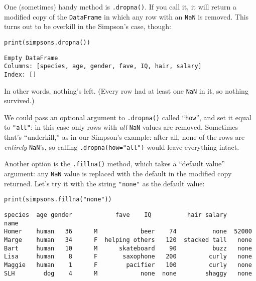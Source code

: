 
One (sometimes) handy method is \texttt{.dropna()}. If you call it, it will
return a modified copy of the \texttt{DataFrame} in which any row with an
\texttt{NaN} is removed. This turns out to be overkill in the Simpson's case,
though:

\begin{Verbatim}[fontsize=\small,samepage=true,frame=single,framesep=3mm]
print(simpsons.dropna())
\end{Verbatim}
\vspace{-.2in}

\begin{Verbatim}[fontsize=\small,samepage=true,frame=leftline,framesep=5mm,framerule=1mm]
Empty DataFrame
Columns: [species, age, gender, fave, IQ, hair, salary]
Index: []
\end{Verbatim}

In other words, nothing's left. (Every row had at least one \texttt{NaN} in
it, so nothing survived.)

We could pass an optional argument to \texttt{.dropna()} called
``\texttt{how}'', and set it equal to \texttt{"all"}: in this case only rows
with \textit{all} \texttt{NaN} values are removed. Sometimes that's
``underkill,'' as in our Simpson's example: after all, none of the rows are
\textit{entirely} \texttt{NaN}'s, so calling \texttt{.dropna(how="all")}
would leave everything intact.


Another option is the \texttt{.fillna()} method, which takes a ``default
value'' argument: any \texttt{NaN} value is replaced with the default in the
modified copy returned. Let's try it with the string \texttt{"none"} as the
default value:

\begin{Verbatim}[fontsize=\small,samepage=true,frame=single,framesep=3mm]
print(simpsons.fillna("none"))
\end{Verbatim}
\vspace{-.2in}

\begin{Verbatim}[fontsize=\scriptsize,samepage=true,frame=leftline,framesep=5mm,framerule=1mm]
       species  age gender            fave    IQ          hair salary
name                                                                 
Homer    human   36      M            beer    74          none  52000
Marge    human   34      F  helping others   120  stacked tall   none
Bart     human   10      M      skateboard    90          buzz   none
Lisa     human    8      F       saxophone   200         curly   none
Maggie   human    1      F        pacifier   100         curly   none
SLH        dog    4      M            none  none        shaggy   none
\end{Verbatim}

